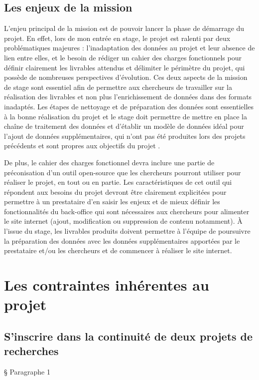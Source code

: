 \subsection{Les enjeux de la mission}
L'enjeu principal de la mission est de pouvoir lancer la phase de démarrage du projet. En effet, lors de mon entrée en stage, le projet est ralenti par deux problématiques majeures : l'inadaptation des données au projet et leur absence de lien entre elles, et le besoin de rédiger un cahier des charges fonctionnels pour définir clairement les livrables attendus et délimiter le périmètre du projet, qui possède de nombreuses perspectives d'évolution. Ces deux aspects de la mission de stage sont essentiel afin de permettre aux chercheurs de travailler sur la réalisation des livrables et non plus l'enrichissement de données dans des formats inadaptés. Les étapes de nettoyage et de préparation des données sont essentielles à la bonne réalisation du projet et le stage doit permettre de mettre en place la chaîne de traitement des données et d'établir un modèle de données idéal pour l'ajout de données supplémentaires, qui n'ont pas été produites lors des projets précédents et sont propres aux objectifs du projet \COREL.

De plus, le cahier des charges fonctionnel devra inclure une partie de préconisation d'un outil open-source que les chercheurs pourront utiliser pour réaliser le projet, en tout ou en partie. Les caractéristiques de cet outil qui répondent aux besoins du projet devront être clairement explicitées pour permettre à un prestataire d'en saisir les enjeux et de mieux définir les fonctionnalités du back-office qui sont nécessaires aux chercheurs pour alimenter le site internet (ajout, modification ou suppression de contenu notamment). À l'issue du stage, les livrables produits doivent permettre à l'équipe de poursuivre la préparation des données avec les données supplémentaires apportées par le prestataire et/ou les chercheurs et de commencer à réaliser le site internet. 

\section{Les contraintes inhérentes au projet}
    \subsection{S’inscrire dans la continuité de deux projets de recherches}

§ Paragraphe 1

